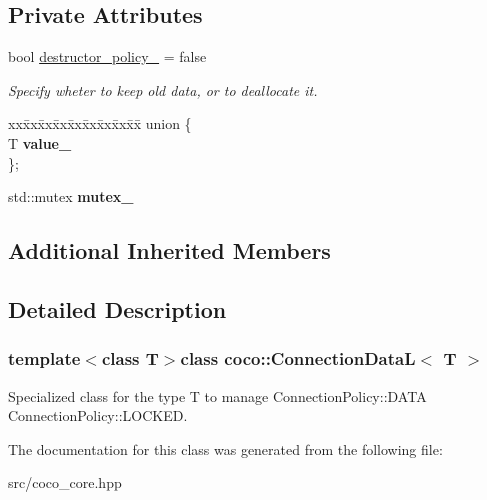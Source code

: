 \subsection*{Private Attributes}
\begin{DoxyCompactItemize}
\item 
\hypertarget{classcoco_1_1_connection_data_l_adba729c90ce839b4a4e72fba0edb0a59}{}bool \hyperlink{classcoco_1_1_connection_data_l_adba729c90ce839b4a4e72fba0edb0a59}{destructor\+\_\+policy\+\_\+} = false\label{classcoco_1_1_connection_data_l_adba729c90ce839b4a4e72fba0edb0a59}

\begin{DoxyCompactList}\small\item\em Specify wheter to keep old data, or to deallocate it. \end{DoxyCompactList}\item 
\hypertarget{classcoco_1_1_connection_data_l_a31184a1cae19c735ac431d9f8f56c17f}{}\begin{tabbing}
xx\=xx\=xx\=xx\=xx\=xx\=xx\=xx\=xx\=\kill
union \{\\
\>T {\bfseries value\_}\\
\}; \label{classcoco_1_1_connection_data_l_a31184a1cae19c735ac431d9f8f56c17f}
\\

\end{tabbing}\item 
\hypertarget{classcoco_1_1_connection_data_l_a91cb8bc898a25547424fbc30fd5871d4}{}std\+::mutex {\bfseries mutex\+\_\+}\label{classcoco_1_1_connection_data_l_a91cb8bc898a25547424fbc30fd5871d4}

\end{DoxyCompactItemize}
\subsection*{Additional Inherited Members}


\subsection{Detailed Description}
\subsubsection*{template$<$class T$>$class coco\+::\+Connection\+Data\+L$<$ T $>$}

Specialized class for the type T to manage Connection\+Policy\+::\+D\+A\+T\+A Connection\+Policy\+::\+L\+O\+C\+K\+E\+D. 

The documentation for this class was generated from the following file\+:\begin{DoxyCompactItemize}
\item 
src/coco\+\_\+core.\+hpp\end{DoxyCompactItemize}

